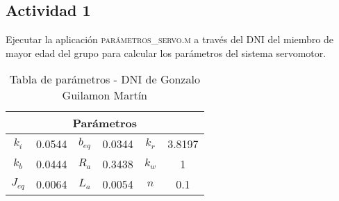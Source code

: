 \subsection{Actividad 1}
 Ejecutar la aplicación \textsc{parámetros\_servo.m} a través del
\textsc{DNI} del miembro de mayor edad del grupo para calcular los
parámetros del sistema servomotor.

\begin{table}[H]
\centering
\begin{tabular}{|c|c|c|c|c|c|} 
 \hline
  \multicolumn{6}{|c|}{Parámetros} \\
 \hline\hline
$k_i$ & 0.0544 & $b_{eq}$ & 0.0344 & $k_r$ & 3.8197 \\\hline
 $k_b$ & 0.0444 & $R_a$ & 0.3438 & $k_w$ & 1 \\\hline
 $J_{eq}$ & 0.0064 & $L_a$ & 0.0054 & $n$ & 0.1 \\\hline
\end{tabular}
\caption{Tabla de parámetros - DNI de Gonzalo Guilamon Martín}
\label{table:1}
\end{table}